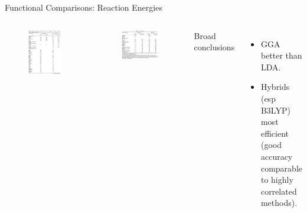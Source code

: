 \documentclass[aspectratio=169]{beamer}
\begin{document}
    \begin{frame}{Functional Comparisons: Reaction Energies}
        \begin{columns}
            \begin{figure}
                \centering
                \includegraphics[width=0.8\linewidth]{lectures/figures/6_rxn_energies1.png}
            \end{figure}

            \begin{figure}
                \centering
                \includegraphics[width=0.5\linewidth]{lectures/figures/6_rxn_energies2.png}
            \end{figure}
            Broad conclusions
            \begin{itemize}
                \item GGA better than LDA.
                \item Hybrids (esp B3LYP) most efficient (good accuracy comparable to highly correlated methods).
            \end{itemize}

        \end{columns}

    \end{frame}
\end{document}
